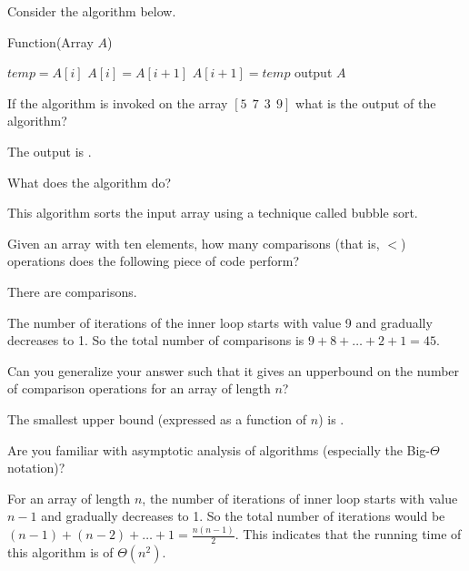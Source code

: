 \documentclass{ximera}
\begin{document}
\begin{question}
Consider the algorithm below.
\begin{algorithm}
\caption{Function(Array $A$)}
\begin{algorithmic}
  \STATE $temp = A[i]$
  \STATE $A[i] = A[i+1]$
  \STATE $A[i+1] = temp$
  \ENDIF
  \ENDFOR
  \ENDFOR
  \STATE output $A$
\end{algorithmic}
\end{algorithm}

If the algorithm is invoked on the array $[ 5~~ 7~~ 3~~ 9]$ what is the output of the algorithm?
\begin{solution}
The output is .
\end{solution}

What does the algorithm do? 
\begin{free-response}
\end{free-response}
This algorithm sorts the input array using a technique called bubble sort.

Given an array with ten elements, how many comparisons (that is, $<$) operations does the following piece of code perform?
\begin{solution}
There are  comparisons.
\end{solution}  
The number of iterations of the inner loop starts with value 9 and gradually decreases to 1. So the total number of comparisons is $ 9 + 8 + \ldots + 2 + 1 = 45$.

Can you generalize your answer such that it gives an upperbound on the number of comparison operations for an array of length $n$?
\begin{solution}
The smallest upper bound (expressed as a function of $n$) is .
\end{solution}
\begin{hint}
Are you familiar with asymptotic analysis of algorithms (especially the Big-$\Theta$ notation)? 
\end{hint}
For an array of length $n$, the number of iterations of inner loop starts with value $n-1$ and gradually decreases to 1. So the total number of iterations would be $(n-1) + (n-2) + \ldots + 1 = \frac{n(n-1)}{2}$. This indicates that the running time of this algorithm is of $\Theta(n^2)$.
\end{question}
\end{document}
